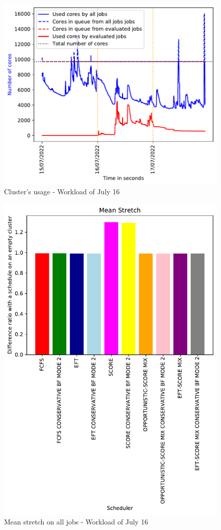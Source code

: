 \documentclass[conference,10pt]{IEEEtran}
\begin{document}
\begin{figure}[H]\centering\includegraphics[width=1\linewidth]{../MBSS/plot/2022-07-16->2022-07-16_V10000_bigger_Fcfs_Used_nodes_Reduced_450_128_32_256_4_1024.pdf}\caption{Cluster's usage - Workload of July 16}\end{figure}
\begin{figure}\centering\includegraphics[width=1\linewidth]{../MBSS/plot/Results_FCFS_Score_Backfill_2022-07-16->2022-07-16_V10000_Mean_Stretch_450_128_32_256_4_1024.pdf}\caption{Mean stretch on all jobs - Workload of July 16}\end{figure}
\end{document}

